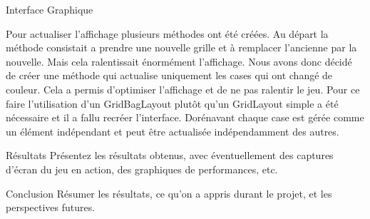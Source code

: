 \documentclass[a4paper, 10pt]{article}
\begin{document}
\begin{section}{Interface Graphique}
        \par
            Pour actualiser l'affichage plusieurs méthodes ont été créées. Au départ la méthode consistait a prendre une nouvelle grille et à remplacer l'ancienne par la nouvelle. Mais cela ralentissait énormément l'affichage. Nous avons donc décidé de créer une méthode qui actualise uniquement les cases qui ont changé de couleur. Cela a permis d'optimiser l'affichage et de ne pas ralentir le jeu.
            Pour ce faire l'utilisation d'un GridBagLayout plutôt qu'un GridLayout simple a été nécessaire et il a fallu recréer l'interface. Dorénavant chaque case est gérée comme un élément indépendant et peut être actualisée indépendamment des autres.
    \end{section}

    \begin{section}{Résultats}\label{sec:resultats}
        Présentez les résultats obtenus, avec éventuellement des captures d'écran du jeu en action, des graphiques de performances, etc.
    \end{section}

    \begin{section}{Conclusion}\label{sec:conclusion}
        Résumer les résultats, ce qu'on a appris durant le projet, et les perspectives futures.
    \end{section}

    
    
    
\end{document}
